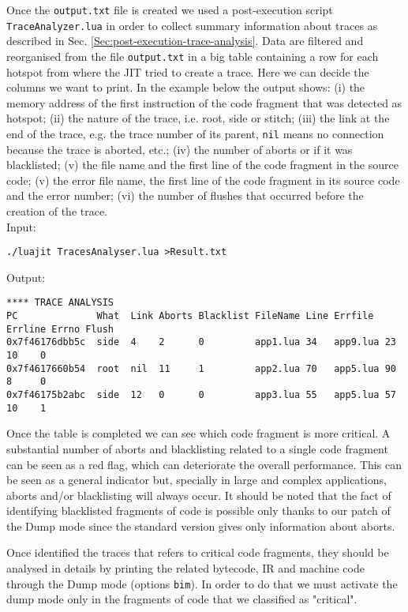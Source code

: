 Once the \texttt{output.txt} file is created we used a post-execution script \texttt{TraceAnalyzer.lua} in order to collect summary information about traces as described in Sec. \ref{Sec:post-execution-trace-analysis}. Data are filtered and reorganised from the file \texttt{output.txt} in a big table containing a row for each hotspot from where the JIT tried to create a trace. Here we can decide the columns we want to print. In the example below the output shows: (i) the memory address of the first instruction of the code fragment that was detected as hotspot; (ii) the nature of the trace, i.e. root, side or stitch; (iii) the link at the end of the trace, e.g. the trace number of its parent, \texttt{nil} means no connection because the trace is aborted, etc.; (iv) the number of aborts or if it was blacklisted; (v) the file name and the first line of the code fragment in the source code; (v) the error file name, the first line of the code fragment in its source code and the error number; (vi) the number of flushes that occurred before the creation of the trace.\\

\noindent
Input:
\begin{lstlisting}[style=CommandsLuaJIT]
  ./luajit TracesAnalyser.lua >Result.txt 
\end{lstlisting}

\noindent
Output:
\begin{lstlisting}[style=CommandsLuaJIT]
**** TRACE ANALYSIS
PC              What  Link Aborts Blacklist FileName Line Errfile  Errline Errno Flush 
0x7f46176dbb5c  side  4    2      0         app1.lua 34   app9.lua 23      10    0     
0x7f4617660b54  root  nil  11     1         app2.lua 70   app5.lua 90      8     0
0x7f46175b2abc  side  12   0      0         app3.lua 55   app5.lua 57      10    1
\end{lstlisting}

\noindent
Once the table is completed we can see which code fragment is more critical. A substantial number of aborts and blacklisting related to a single code fragment can be seen as a red flag, which can deteriorate the overall performance. This can be seen as a general indicator but, specially in large and complex applications, aborts and/or blacklisting will always occur. It should be noted that the fact of identifying blacklisted fragments of code is possible only thanks to our patch of the Dump mode since the standard version gives only information about aborts. 


Once identified the traces that refers to critical code fragments, they should be analysed in details by printing the related bytecode, IR and machine code through the Dump mode (options \texttt{bim}). In order to do that we must activate the dump mode only in the fragments of code that we classified as "critical".

